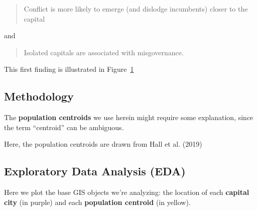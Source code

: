 \documentclass[
  letterpaper,
  DIV=11,
  numbers=noendperiod]{scrartcl}
\begin{document}
\begin{quote}
Conflict is more likely to emerge (and dislodge incumbents) closer to
the capital
\end{quote}

and

\begin{quote}
Isolated capitals are associated with misgovernance.
\end{quote}

This first finding is illustrated in Figure~\ref{fig-conflict-dist}

\begin{figure}


\caption{\label{fig-conflict-dist}}

\end{figure}%

\subsection{Methodology}\label{methodology}

The \textbf{population centroids} we use herein might require some
explanation, since the term ``centroid'' can be ambiguous.

Here, the population centroids are drawn from Hall et al. (2019)

\subsection{Exploratory Data Analysis
(EDA)}\label{exploratory-data-analysis-eda}

Here we plot the base GIS objects we're analyzing: the location of each
\textbf{capital city} (in purple) and each \textbf{population centroid}
(in yellow).
\end{document}
